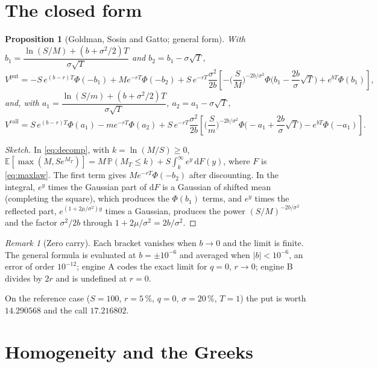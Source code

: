\documentclass[11pt,a4paper]{article}
\newtheorem{proposition}{Proposition}
\theoremstyle{remark}
\newtheorem{remark}{Remark}
\newcommand{\E}{\mathbb{E}}
\newcommand{\Prob}{\mathbb{P}}
\begin{document}
\section{The closed form}\label{sec:closed}
\begin{proposition}[Goldman, Sosin and Gatto; general form]\label{prop:gsg}
With $b_1=\dfrac{\ln(S/M)+(b+\sigma^2/2)T}{\sigma\sqrt T}$ and $b_2=b_1-\sigma\sqrt T$,
\begin{equation}
  V^{\mathrm{put}}=-S\,e^{(b-r)T}\Phi(-b_1)+M e^{-rT}\Phi(-b_2)
   +S\,e^{-rT}\frac{\sigma^2}{2b}\left[-\Big(\frac SM\Big)^{-2b/\sigma^2}\Phi\Big(b_1-\frac{2b}{\sigma}\sqrt T\Big)+e^{bT}\Phi(b_1)\right],
\end{equation}
and, with $a_1=\dfrac{\ln(S/m)+(b+\sigma^2/2)T}{\sigma\sqrt T}$, $a_2=a_1-\sigma\sqrt T$,
\begin{equation}
  V^{\mathrm{call}}=S\,e^{(b-r)T}\Phi(a_1)-m e^{-rT}\Phi(a_2)
   +S\,e^{-rT}\frac{\sigma^2}{2b}\left[\Big(\frac Sm\Big)^{-2b/\sigma^2}\Phi\Big(-a_1+\frac{2b}{\sigma}\sqrt T\Big)-e^{bT}\Phi(-a_1)\right].
\end{equation}
\end{proposition}
\begin{proof}[Sketch]
In \eqref{eq:decomp}, with $k=\ln(M/S)\ge0$,
$\E[\max(M,Se^{M_T})]=M\,\Prob(M_T\le k)+S\int_k^\infty e^y\,\mathrm dF(y)$, where $F$ is \eqref{eq:maxlaw}. The first term gives
$Me^{-rT}\Phi(-b_2)$ after discounting. In the integral, $e^y$ times the Gaussian part of $\mathrm dF$ is a Gaussian of shifted mean
(completing the square), which produces the $\Phi(b_1)$ terms, and $e^y$ times the reflected part, $e^{(1+2\mu/\sigma^2)y}$ times a
Gaussian, produces the power $(S/M)^{-2b/\sigma^2}$ and the factor $\sigma^2/2b$ through $1+2\mu/\sigma^2=2b/\sigma^2$.
\end{proof}
\begin{remark}[Zero carry]
Each bracket vanishes when $b\to0$ and the limit is finite. The general formula is evaluated at $b=\pm10^{-6}$ and averaged when
$|b|<10^{-6}$, an error of order $10^{-12}$; engine A codes the exact limit for $q=0$, $r\to0$; engine B divides by $2r$ and is
undefined at $r=0$.
\end{remark}
On the reference case ($S=100$, $r=5\,\%$, $q=0$, $\sigma=20\,\%$, $T=1$) the put is worth $14.290568$ and the call $17.216802$.

\section{Homogeneity and the Greeks}\label{sec:homog}
\end{document}
